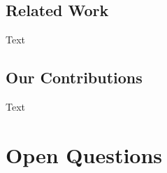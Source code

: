 \subsection{Related Work} 
Text

\subsection{Our Contributions}
Text

\clearpage


\section{Open Questions}
\label{ch2:questions}

\clearpage




